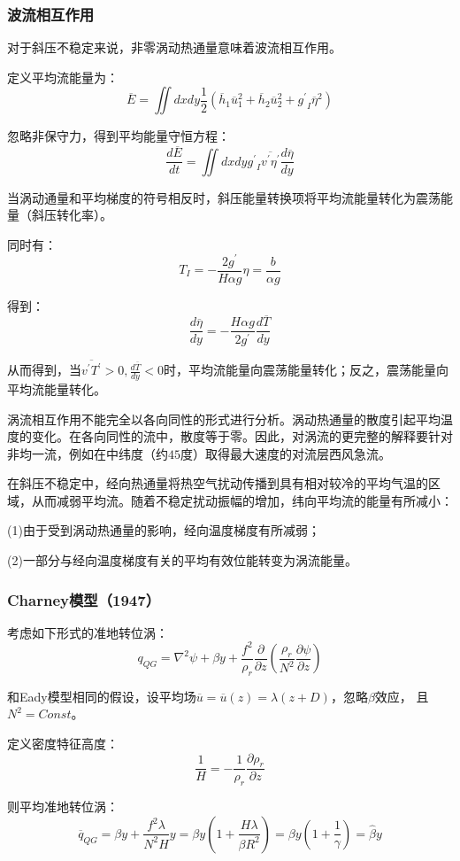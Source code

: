 \documentclass{article}
\begin{document}
\subsubsection{波流相互作用}
对于斜压不稳定来说，非零涡动热通量意味着波流相互作用。

定义平均流能量为：
$$\overline{E}=\iint{dxdy\frac{1}{2}}({{\overline{h}}_{1}}\overline{u}_{1}^{2}+{{\overline{h}}_{2}}\overline{u}_{2}^{2}+{{{g}^{\prime}}_{I}}{{\overline{\eta }}^{2}})$$

忽略非保守力，得到平均能量守恒方程：
$$\frac{d\overline{E}}{dt}=\iint{dxdy}{{{g}^{\prime}}_{I}}\overline{{v}^{\prime}{\eta }^{\prime}}\frac{d\overline{\eta }}{dy}$$

当涡动通量和平均梯度的符号相反时，斜压能量转换项将平均流能量转化为震荡能量（斜压转化率）。

同时有：
$$T_I = -\frac{2g^{\prime}}{H\alpha g}\eta = \frac{b}{\alpha g }$$

得到：
$$\frac{d\overline{\eta }}{dy} = -\frac{H\alpha g}{2g^{\prime}}\frac{d\overline{T}}{dy}$$

从而得到，当$\overline{v^{\prime}T^{\prime}}>0, \frac{d\overline{T}}{dy}<0$时，平均流能量向震荡能量转化；反之，震荡能量向平均流能量转化。

涡流相互作用不能完全以各向同性的形式进行分析。涡动热通量的散度引起平均温度的变化。在各向同性的流中，散度等于零。因此，对涡流的更完整的解释要针对非均一流，例如在中纬度（约$45$度）取得最大速度的对流层西风急流。

在斜压不稳定中，经向热通量将热空气扰动传播到具有相对较冷的平均气温的区域，从而减弱平均流。随着不稳定扰动振幅的增加，纬向平均流的能量有所减小：

(1)由于受到涡动热通量的影响，经向温度梯度有所减弱；

(2)一部分与经向温度梯度有关的平均有效位能转变为涡流能量。

\subsubsection{Charney模型（1947）}
考虑如下形式的准地转位涡：
$$q_{QG} = \nabla^2\psi + \beta y 
+ \frac{f^2}{\rho_r}\frac{\partial }{\partial z}
(\frac{\rho_r}{N^2}\frac{\partial \psi}{\partial z})$$

和Eady模型相同的假设，设平均场$\overline{u} = \overline{u}(z) = \lambda (z+D)$，忽略$\beta$效应，
且$N^2=Const$。

定义密度特征高度：
$$\frac{1}{H} = -\frac{1}{\rho_r}\frac{\partial \rho_r}{\partial z}$$

则平均准地转位涡：
$$\overline{q}_{QG} = \beta y + \frac{f^2\lambda}{N^2H} y 
= \beta y\left(1 + \frac{H\lambda}{\beta R^2}\right)
= \beta y\left(1 + \frac{1}{\gamma}\right)
= \hat{\beta} y$$
\end{document}
